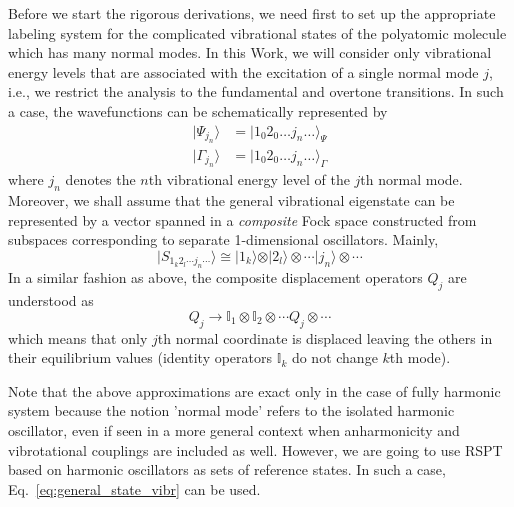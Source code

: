 \documentclass[a4paper,titlepage,twoside,fleqn,12pt]{book}
\begin{document}
\begin{refsection}
Before we start the rigorous derivations, we need first to set up the appropriate labeling system
for the complicated vibrational states of the polyatomic molecule which has many normal modes.
In this Work, we will consider only vibrational energy levels that are associated with
the excitation of a single normal mode $j$, i.e., we restrict the analysis to the fundamental
and overtone transitions. In such a case, the 
wavefunctions can be schematically represented by
%
\begin{eqnarray}
\vert \Psi_{j_n}   \rangle &= \vert 1_0 2_0 \ldots j_n \ldots \rangle_{\Psi} \\
\vert \Gamma_{j_n} \rangle &= \vert 1_0 2_0 \ldots j_n \ldots \rangle_{\Gamma} 
\end{eqnarray}
%
where $j_n$ denotes the $n$th vibrational energy level of the $j$th normal mode.
Moreover, we shall assume that the general vibrational 
eigenstate can be represented by a vector spanned
in a \emph{composite} Fock space constructed from subspaces corresponding 
to separate 1\hyp{}dimensional oscillators. Mainly,
%
\begin{equation}  \label{eq:general_state_vibr}
\vert S_{1_k2_l\cdots j_n\cdots}   \rangle 
 \cong \vert 1_k \rangle \otimes \vert 2_l \rangle \otimes \cdots \vert j_n \rangle \otimes \cdots 
\end{equation}
%
In a similar fashion as above, the composite displacement operators $Q_j$
are understood as
%
\begin{equation}
Q_j \rightarrow \mathbb{I}_1 \otimes \mathbb{I}_2 \otimes \cdots Q_j \otimes \cdots
\end{equation}
%
which means that only $j$th normal coordinate is displaced leaving the others
in their equilibrium values (identity operators $\mathbb{I}_k$ do not change $k$th mode).

Note that the above approximations are exact only in the case of 
fully harmonic system because the notion 'normal mode' refers to
the isolated harmonic oscillator, even if seen in a more general context
when anharmonicity and vibrotational couplings are included as well.
However, we are going to use RSPT based on harmonic oscillators as 
sets of reference states. In such a case, Eq.~\eqref{eq:general_state_vibr} 
can be used.


\end{refsection}
\end{document}
